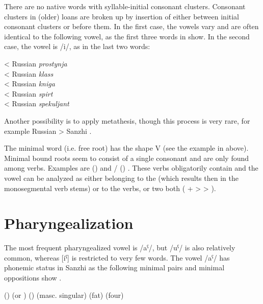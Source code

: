 There are no native words with syllable-initial consonant clusters. Consonant clusters in (older) loans are broken up by insertion of  either between initial consonant clusters or before them. In the first case, the vowels vary and are often identical to the following vowel, as the first three words in  show. In the second case, the vowel is /i/, as in the last two words:
%
\begin{exe}
	\ex	\label{ex:epenthesis phon}
	\TabPositions{11em}
	 	\tab 	< Russian \textit{prostynja}	\\
		 	\tab 	< Russian \textit{klass}	\\
		 		\tab 	< Russian \textit{kniga}	\\
		 	\tab < Russian \textit{spirt} \\
				  \tab  < Russian \textit{spekuljant} 		
\end{exe}

Another possibility is to apply metathesis, though this process is very rare, for example Russian  > Sanzhi  .

The minimal word (i.e. free root) has the shape V (see the example in  above). Minimal bound roots seem to consist of a single consonant and are only found among verbs. Examples are  ()  and \slash{} () . These verbs obligatorily contain  and the vowel can be analyzed as either belonging to the  (which results then in the monosegmental verb stems) or to the verbs, or two both ( +  >  > ).



\section{Pharyngealization}
\label{sec:Pharyngealization}

The most frequent pharyngealized vowel is /aˁ/, but /uˁ/ is also relatively common, whereas [iˁ] is restricted to very few words. The vowel /aˁ/ has phonemic status in Sanzhi as the following minimal pairs and minimal oppositions show .
%
\begin{exe}
	\ex	\label{ex:pharyngealization minimal pairs A phon@A}
	\begin{xlist}
\TabPositions{13em}
		\ex	{}  \tab {} 
		\ex	{} ()  \tab {} 
		\ex	{}  \tab {} 
		\ex	{} (or ) () \tab {}  (masc. singular)
		\ex	{}  (fat) \tab {}  (four)
		\ex	{}  \tab {} 
	\end{xlist}
\end{exe}

